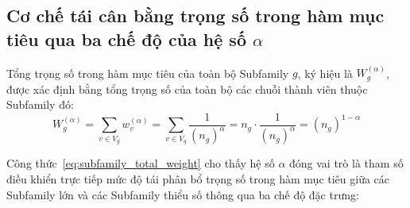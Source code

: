 \subsection{Cơ chế tái cân bằng trọng số trong hàm mục tiêu qua ba chế độ của hệ số \texorpdfstring{$\alpha$}{alpha}}
\label{subsec:alpha_three_regimes}

Tổng trọng số trong hàm mục tiêu của toàn bộ Subfamily $g$, ký hiệu là $W_g^{(\alpha)}$, được xác định bằng tổng trọng số của toàn bộ các chuỗi thành viên thuộc Subfamily đó:
\begin{equation}
\label{eq:subfamily_total_weight}
W_g^{(\alpha)} = \sum_{v \in V_g} w_v^{(\alpha)} = \sum_{v \in V_g} \frac{1}{(n_g)^\alpha} = n_g \cdot \frac{1}{(n_g)^\alpha} = (n_g)^{1 - \alpha}
\end{equation}

Công thức~\eqref{eq:subfamily_total_weight} cho thấy hệ số $\alpha$ đóng vai trò là tham số điều khiển trực tiếp mức độ tái phân bổ trọng số trong hàm mục tiêu giữa các Subfamily lớn và các Subfamily thiểu số thông qua ba chế độ đặc trưng:


